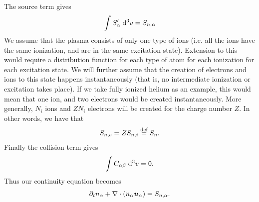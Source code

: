 %
The source term gives
%
\begin{align*}
    \int {S'_{\alpha}} \; \text{d} {^3v} = S_{n,\alpha}
\end{align*}
%
We assume that the plasma consists of only one type of ions (i.e. all the ions have the same ionization, and are in the same excitation state).
Extension to this would require a distribution function for each type of atom for each ionization for each excitation state.
We will further assume that the creation of electrons and ions to this state happens instantaneously (that is, no intermediate ionization or excitation takes place).
If we take fully ionized helium as an example, this would mean that one ion, and two electrons would be created instantaneously.
More generally, $N_i$ ions and $ZN_i$ electrons will be created for the charge number $Z$.
In other words, we have that
%
\begin{align}
    S_{n,e}=ZS_{n,i}\overset{\text{def}}{=} S_n.
    \label{eq:kinSource}
\end{align}
%
Finally the collision term gives
%
\begin{align*}
    \int {C_{\alpha\beta}} \; \text{d} {^3v} = 0.
\end{align*}
%
Thus our continuity equation becomes
%
\begin{align}
    \partial_t n_\alpha + \nabla\cdot\left(n_\alpha \boldsymbol{u}_\alpha\right) = S_{n,\alpha} \label{kin:cont}.
\end{align}

